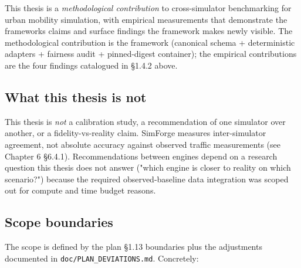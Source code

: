 This thesis is a \emph{methodological contribution} to cross-simulator
benchmarking for urban mobility simulation, with empirical measurements
that demonstrate the framework\textquotesingle s claims and surface
findings the framework makes newly visible. The methodological
contribution is the framework (canonical schema + deterministic adapters
+ fairness audit + pinned-digest container); the empirical contributions
are the four findings catalogued in §1.4.2 above.

\subsection{What this thesis is
not}\label{152-what-this-thesis-is-not}

This thesis is \emph{not} a calibration study, a recommendation of one
simulator over another, or a fidelity-vs-reality claim. SimForge
measures inter-simulator agreement, not absolute accuracy against
observed traffic measurements (see Chapter 6 §6.4.1). Recommendations
between engines depend on a research question this thesis does not
answer ("which engine is closer to reality on which scenario?") because
the required observed-baseline data integration was scoped out for
compute and time budget reasons.

\subsection{Scope boundaries}\label{153-scope-boundaries}

The scope is defined by the plan §1.13 boundaries plus the
adjustments documented in \texttt{doc/PLAN\_DEVIATIONS.md}.
Concretely:

